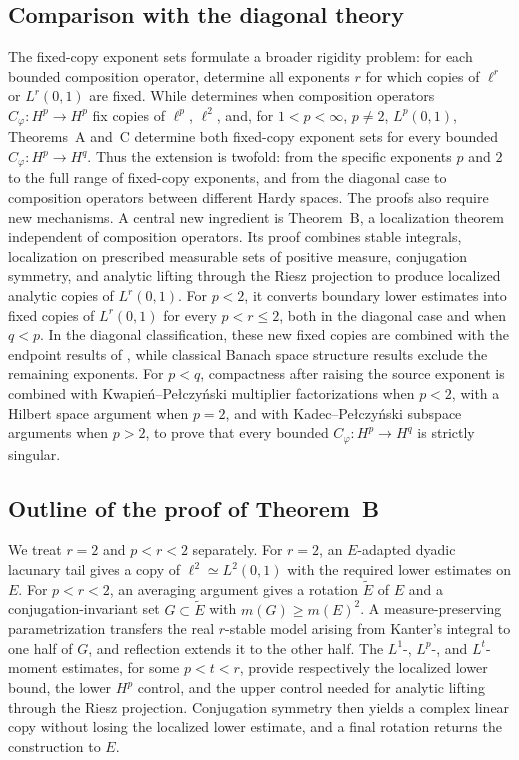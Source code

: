 \documentclass[11pt, reqno]{amsart}
\theoremstyle{definition}
\theoremstyle{remark}
\begin{document}
\subsection*{Comparison with the diagonal theory}


The fixed-copy exponent sets formulate a broader rigidity problem:
for each bounded composition operator, determine all exponents
\(r\) for which copies of \(\ell^r\) or \(L^r(0,1)\) are fixed.
While \cite{LNST2017} determines when composition operators
\(C_\varphi:H^p\to H^p\) fix copies of \(\ell^p\), \(\ell^2\),
and, for \(1<p<\infty\), \(p\ne2\), \(L^p(0,1)\),
Theorems~A and~C determine both fixed-copy exponent sets for every
bounded \(C_\varphi:H^p\to H^q\). Thus the extension is twofold:
from the specific exponents \(p\) and \(2\) to the full range of
fixed-copy exponents, and from the diagonal case to composition
operators between different Hardy spaces. The proofs also require
new mechanisms. A central new ingredient is Theorem~B, a localization
theorem independent of composition operators. Its proof combines stable integrals, localization on
prescribed measurable sets of positive measure, conjugation symmetry,
and analytic lifting through the Riesz projection to produce
localized analytic copies of \(L^r(0,1)\). For \(p<2\), it converts boundary lower estimates into fixed copies
of \(L^r(0,1)\) for every \(p<r\le2\), both in the diagonal case
and when \(q<p\). In the diagonal classification, these new fixed
copies are combined with the endpoint results of \cite{LNST2017},
while classical Banach space structure results exclude the remaining
exponents. For \(p<q\),
compactness after raising the source exponent is combined with
Kwapie\'n--Pe{\l}czy\'nski multiplier factorizations when \(p<2\),
with a Hilbert space argument when \(p=2\), and with
Kadec--Pe{\l}czy\'nski subspace arguments when \(p>2\), to prove
that every bounded \(C_\varphi:H^p\to H^q\) is strictly singular.

\subsection*{Outline of the proof of Theorem~B}

We treat \(r=2\) and \(p<r<2\) separately. For \(r=2\), an
\(E\)-adapted dyadic lacunary tail gives a copy of
\(\ell^2\simeq L^2(0,1)\) with the required lower estimates on \(E\).
For \(p<r<2\), an averaging argument gives a rotation
\(\widetilde E\) of \(E\) and a conjugation-invariant set
\(G\subset\widetilde E\) with \(m(G)\ge m(E)^2\). A
measure-preserving parametrization transfers the real \(r\)-stable
model arising from Kanter's integral to one half of \(G\), and
reflection extends it to the other half. The \(L^1\)-, \(L^p\)-,
and \(L^t\)-moment estimates, for some \(p<t<r\), provide
respectively the localized lower bound, the lower \(H^p\) control,
and the upper control needed for analytic lifting through the Riesz
projection. Conjugation symmetry then yields a complex linear copy
without losing the localized lower estimate, and a final rotation
returns the construction to \(E\).
\end{document}
